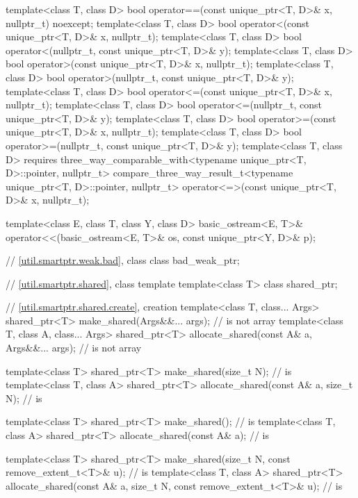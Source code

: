 \begin{codeblock}
{  template<class T, class D>
    bool operator==(const unique_ptr<T, D>& x, nullptr_t) noexcept;
  template<class T, class D>
    bool operator<(const unique_ptr<T, D>& x, nullptr_t);
  template<class T, class D>
    bool operator<(nullptr_t, const unique_ptr<T, D>& y);
  template<class T, class D>
    bool operator>(const unique_ptr<T, D>& x, nullptr_t);
  template<class T, class D>
    bool operator>(nullptr_t, const unique_ptr<T, D>& y);
  template<class T, class D>
    bool operator<=(const unique_ptr<T, D>& x, nullptr_t);
  template<class T, class D>
    bool operator<=(nullptr_t, const unique_ptr<T, D>& y);
  template<class T, class D>
    bool operator>=(const unique_ptr<T, D>& x, nullptr_t);
  template<class T, class D>
    bool operator>=(nullptr_t, const unique_ptr<T, D>& y);
  template<class T, class D>
    requires three_way_comparable_with<typename unique_ptr<T, D>::pointer, nullptr_t>
    compare_three_way_result_t<typename unique_ptr<T, D>::pointer, nullptr_t>
      operator<=>(const unique_ptr<T, D>& x, nullptr_t);

  template<class E, class T, class Y, class D>
    basic_ostream<E, T>& operator<<(basic_ostream<E, T>& os, const unique_ptr<Y, D>& p);

  // \ref{util.smartptr.weak.bad}, class 
  class bad_weak_ptr;

  // \ref{util.smartptr.shared}, class template 
  template<class T> class shared_ptr;

  // \ref{util.smartptr.shared.create},  creation
  template<class T, class... Args>
    shared_ptr<T> make_shared(Args&&... args);                                  //  is not array
  template<class T, class A, class... Args>
    shared_ptr<T> allocate_shared(const A& a, Args&&... args);                  //  is not array

  template<class T>
    shared_ptr<T> make_shared(size_t N);                                        //  is 
  template<class T, class A>
    shared_ptr<T> allocate_shared(const A& a, size_t N);                        //  is 

  template<class T>
    shared_ptr<T> make_shared();                                                //  is 
  template<class T, class A>
    shared_ptr<T> allocate_shared(const A& a);                                  //  is 

  template<class T>
    shared_ptr<T> make_shared(size_t N, const remove_extent_t<T>& u);           //  is 
  template<class T, class A>
    shared_ptr<T> allocate_shared(const A& a, size_t N,
                                  const remove_extent_t<T>& u);                 //  is 

}
\end{codeblock}

